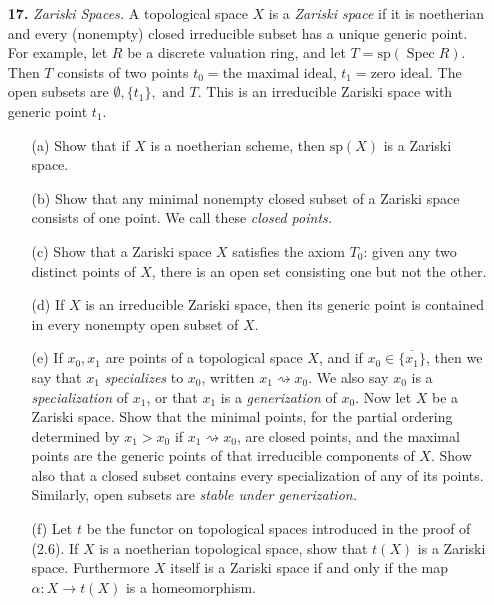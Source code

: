 \documentclass{article}
\DeclareMathOperator{\spec}{Spec}
\begin{document}
\begin{enumerate} [label=\textbf{\arabic*.}, leftmargin=0em]
\item[\textbf{17.}] \textit{Zariski Spaces.} A topological space $X $ is a \textit{Zariski space} if it is noetherian and every (nonempty) closed irreducible subset has a unique generic point.
For example, let $R$ be a discrete valuation ring, and let $T = \text{sp}(\spec{R})$. Then $T$ consists of two points $t_0 = \text{the maximal ideal}$, $t_1 = \text{zero ideal}$. The open subsets are $\emptyset, \{ t_1 \}, \text{ and } T$. This is an irreducible Zariski space with generic point $t_1$.
\begin{itemize} [leftmargin=0em]
    \item[(a)] Show that if $X$ is a noetherian scheme, then $\text{sp}(X)$ is a Zariski space.
    \item[(b)] Show that any minimal nonempty closed subset of a Zariski space consists of one point. We call these \textit{closed points.}
    \item[(c)] Show that a Zariski space $X$ satisfies the axiom $T_0$: given any two distinct points of $X$, there is an open set consisting one but not the other.
    \item[(d)] If $X$ is an irreducible Zariski space, then its generic point is contained in every nonempty open subset of $X$.
    \item[(e)] If $x_0, x_1$ are points of a topological space $X$, and if $x_0 \in \overline{\{x_1 \}}$, then we say that $x_1$ \textit{specializes} to $x_0$, written $x_1 \rightsquigarrow x_0$. We also say $x_0$ is a \textit{specialization} of $x_1$, or that $x_1$ is a \textit{generization} of $x_0$. Now let $X$ be a Zariski space. Show that the minimal points, for the partial ordering determined by $x_1 > x_0$ if $x_1 \rightsquigarrow x_0$, are closed points, and the maximal points are the generic points of that irreducible components of $X$. Show also that a closed subset contains every specialization of any of its points. Similarly, open subsets are \textit{stable under generization.}
    \item[(f)] Let $t$ be the functor on topological spaces introduced in the proof of (2.6). If $X$ is a noetherian topological space, show that $t(X)$ is a Zariski space. Furthermore $X$ itself is a Zariski space if and only if the map $\alpha : X \to t(X)$ is a homeomorphism.
\end{itemize}


\end{enumerate}
\end{document}
